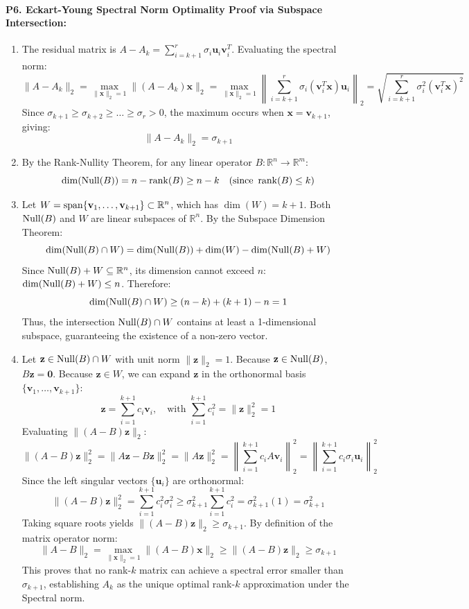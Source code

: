 \paragraph{P6. Eckart-Young Spectral Norm Optimality Proof via Subspace Intersection:}
\begin{enumerate}[label=(\alph*)]
    \item The residual matrix is $A - A_k = \sum_{i=k+1}^r \sigma_i \mathbf{u}_i \mathbf{v}_i^T$.
    Evaluating the spectral norm:
    \[
    \|A - A_k\|_2 = \max_{\|\mathbf{x}\|_2 = 1} \|(A - A_k)\mathbf{x}\|_2 = \max_{\|\mathbf{x}\|_2 = 1} \left\| \sum_{i=k+1}^r \sigma_i (\mathbf{v}_i^T \mathbf{x}) \mathbf{u}_i \right\|_2 = \sqrt{\sum_{i=k+1}^r \sigma_i^2 (\mathbf{v}_i^T \mathbf{x})^2}
    \]
    Since $\sigma_{k+1} \ge \sigma_{k+2} \ge \dots \ge \sigma_r > 0$, the maximum occurs when $\mathbf{x} = \mathbf{v}_{k+1}$, giving:
    \[
    \|A - A_k\|_2 = \sigma_{k+1}
    \]
    \item By the Rank-Nullity Theorem, for any linear operator $B: \mathbb{R}^n \to \mathbb{R}^m$:
    \[
    \dim(\operatorname{Null}(B)) = n - \operatorname{rank}(B) \ge n - k \quad (\text{since } \operatorname{rank}(B) \le k)
    \]
    \item Let $W = \operatorname{span}\{\mathbf{v}_1, \dots, \mathbf{v}_{k+1}\} \subset \mathbb{R}^n$, which has $\dim(W) = k + 1$.
    Both $\operatorname{Null}(B)$ and $W$ are linear subspaces of $\mathbb{R}^n$.
    By the Subspace Dimension Theorem:
    \[
    \dim(\operatorname{Null}(B) \cap W) = \dim(\operatorname{Null}(B)) + \dim(W) - \dim(\operatorname{Null}(B) + W)
    \]
    Since $\operatorname{Null}(B) + W \subseteq \mathbb{R}^n$, its dimension cannot exceed $n$: $\dim(\operatorname{Null}(B) + W) \le n$.
    Therefore:
    \[
    \dim(\operatorname{Null}(B) \cap W) \ge (n - k) + (k + 1) - n = 1
    \]
    Thus, the intersection $\operatorname{Null}(B) \cap W$ contains at least a 1-dimensional subspace, guaranteeing the existence of a non-zero vector.
    \item Let $\mathbf{z} \in \operatorname{Null}(B) \cap W$ with unit norm $\|\mathbf{z}\|_2 = 1$.
    Because $\mathbf{z} \in \operatorname{Null}(B)$, $B\mathbf{z} = \mathbf{0}$.
    Because $\mathbf{z} \in W$, we can expand $\mathbf{z}$ in the orthonormal basis $\{\mathbf{v}_1, \dots, \mathbf{v}_{k+1}\}$:
    \[
    \mathbf{z} = \sum_{i=1}^{k+1} c_i \mathbf{v}_i, \quad \text{with } \sum_{i=1}^{k+1} c_i^2 = \|\mathbf{z}\|_2^2 = 1
    \]
    Evaluating $\|(A - B)\mathbf{z}\|_2$:
    \[
    \|(A - B)\mathbf{z}\|_2^2 = \|A\mathbf{z} - B\mathbf{z}\|_2^2 = \|A\mathbf{z}\|_2^2 = \left\| \sum_{i=1}^{k+1} c_i A\mathbf{v}_i \right\|_2^2 = \left\| \sum_{i=1}^{k+1} c_i \sigma_i \mathbf{u}_i \right\|_2^2
    \]
    Since the left singular vectors $\{\mathbf{u}_i\}$ are orthonormal:
    \[
    \|(A - B)\mathbf{z}\|_2^2 = \sum_{i=1}^{k+1} c_i^2 \sigma_i^2 \ge \sigma_{k+1}^2 \sum_{i=1}^{k+1} c_i^2 = \sigma_{k+1}^2 (1) = \sigma_{k+1}^2
    \]
    Taking square roots yields $\|(A - B)\mathbf{z}\|_2 \ge \sigma_{k+1}$.
    By definition of the matrix operator norm:
    \[
    \|A - B\|_2 = \max_{\|\mathbf{x}\|_2 = 1} \|(A - B)\mathbf{x}\|_2 \ge \|(A - B)\mathbf{z}\|_2 \ge \sigma_{k+1}
    \]
    This proves that no rank-$k$ matrix can achieve a spectral error smaller than $\sigma_{k+1}$, establishing $A_k$ as the unique optimal rank-$k$ approximation under the Spectral norm.
\end{enumerate}

